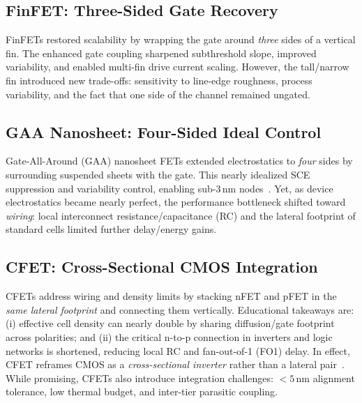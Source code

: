 \documentclass[conference]{IEEEtran}
\begin{document}
\subsection{FinFET: Three-Sided Gate Recovery}
FinFETs restored scalability by wrapping the gate around \emph{three} sides of a vertical fin.
The enhanced gate coupling sharpened subthreshold slope, improved variability, and enabled multi-fin drive current scaling.
However, the tall/narrow fin introduced new trade-offs: sensitivity to line-edge roughness, process variability, and the fact that one side of the channel remained ungated.

\subsection{GAA Nanosheet: Four-Sided Ideal Control}
Gate-All-Around (GAA) nanosheet FETs extended electrostatics to \emph{four} sides by surrounding suspended sheets with the gate.
This nearly idealized SCE suppression and variability control, enabling sub-3\,nm nodes~\cite{bsimcmg_sispad2017}.
Yet, as device electrostatics became nearly perfect, the performance bottleneck shifted toward \emph{wiring}: local interconnect resistance/capacitance (RC) and the lateral footprint of standard cells limited further delay/energy gains.

\subsection{CFET: Cross-Sectional CMOS Integration}
CFETs address wiring and density limits by stacking nFET and pFET in the \emph{same lateral footprint} and connecting them vertically.
Educational takeaways are:
(i) effective cell density can nearly double by sharing diffusion/gate footprint across polarities; and
(ii) the critical n-to-p connection in inverters and logic networks is shortened, reducing local RC and fan-out-of-1 (FO1) delay.
In effect, CFET reframes CMOS as a \emph{cross-sectional inverter} rather than a lateral pair~\cite{imec_cfet_iedm2020}.
While promising, CFETs also introduce integration challenges: $<5$\,nm alignment tolerance, low thermal budget, and inter-tier parasitic coupling.
\end{document}

